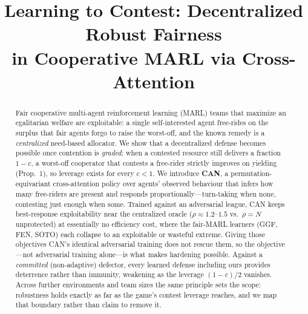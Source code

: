 \documentclass[conference, a4paper]{IEEEtran}
\begin{document}
\title{Learning to Contest: Decentralized Robust Fairness\\
in Cooperative MARL via Cross-Attention}

\makeatletter
\def\@IEEEauthorblockNfont{\fontsize{11pt}{13pt}\selectfont}
\def\@IEEEauthorblockAfont{\fontsize{10pt}{12pt}\selectfont}
\makeatother

\author{
}

\maketitle

\begin{abstract}
Fair cooperative multi-agent reinforcement learning (MARL) teams that maximize an
egalitarian welfare are exploitable: a single self-interested agent free-rides on
the surplus that fair agents forgo to raise the worst-off, and the known remedy
is a \emph{centralized} need-based allocator. We show that a decentralized
defense becomes possible once contention is \emph{graded}: when a contested
resource still delivers a fraction $1{-}c$, a worst-off cooperator that contests
a free-rider strictly improves on yielding (Prop.~1), so leverage exists for
every $c<1$. We introduce \textbf{CAN}, a permutation-equivariant
cross-attention policy over agents' observed behaviour that infers how many
free-riders are present and responds proportionally---turn-taking when none,
contesting just enough when some. Trained against an adversarial league, CAN
keeps best-response exploitability near the centralized oracle
($\rho{\approx}1.2$--$1.5$ vs.\ $\rho{=}N$ unprotected) at essentially no
efficiency cost, where the fair-MARL learners (GGF, FEN, SOTO) each collapse to
an exploitable or wasteful extreme. Giving those objectives CAN's identical
adversarial training does not rescue them, so the objective---not adversarial
training alone---is what makes hardening possible. Against a \emph{committed}
(non-adaptive) defector, every learned defense including ours provides
deterrence rather than immunity, weakening as the leverage $(1{-}c)/2$
vanishes. Across further environments and team sizes the same principle sets
the scope: robustness holds exactly as far as the game's contest leverage
reaches, and we map that boundary rather than claim to remove it.
\end{abstract}
\end{document}
